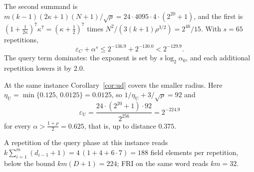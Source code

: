 The second summand is $m(k-1)(2\kappa+1)(N+1)/\sqrt\rho=24\cdot4095\cdot4\cdot(2^{20}+1)$,
and the first is $(1+\frac1{2\kappa})^7\kappa^7=(\kappa+\frac12)^7$ times
$N^2/(3(k+1)\rho^{3/2})=2^{46}/15$. With $s=65$ repetitions,
\[
\varepsilon_C+\alpha^s\le 2^{-136.9}+2^{-130.0}<2^{-129.9}.
\]
The query term dominates: the exponent is set by $s\log_2\alpha_0$, and each additional
repetition lowers it by $2.0$.

At the same instance Corollary~\ref{cor:ud} covers the smaller radius. Here
$\eta_{\mathrm U}=\min\{0.125,\,0.0125\}=0.0125$, so $1/\eta_{\mathrm U}+3/\sqrt\rho=92$ and
\[
\varepsilon_{\mathrm U}=\frac{24\cdot(2^{20}+1)\cdot92}{2^{256}}=2^{-224.9}
\]
for every $\alpha>\frac{1+\rho}2=0.625$, that is, up to distance $0.375$.

A repetition of the query phase at this instance reads $k\sum_{i=1}^{m}(d_{i-1}+1)=4\,(1+4+6\cdot7)=188$ field
elements per repetition, below the bound $km(D+1)=224$; FRI on the same word reads
$km=32$.
